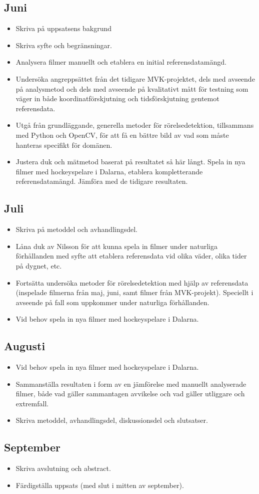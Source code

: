 \documentclass[a4paper,12pt]{article}
\begin{document}
\subsection*{Juni}
\begin{itemize}
  \item Skriva på uppsatsens bakgrund
  \item Skriva syfte och begränsningar.
  \item Analysera filmer manuellt och etablera en initial referensdatamängd.
  \item Undersöka angreppsättet från det tidigare MVK-projektet, dels med
    avseende på analysmetod och dels med avseende på kvalitativt mått för
    testning som väger in både koordinatförskjutning och tidsförskjutning
    gentemot referensdata.
  \item Utgå från grundläggande, generella metoder för rörelsedetektion,
    tillsammans med Python och OpenCV, för att få en bättre bild av vad som
    måste hanteras specifikt för domänen.
  \item Justera duk och mätmetod baserat på resultatet så här långt. Spela
    in nya filmer med hockeyspelare i Dalarna, etablera kompletterande
    referensdatamängd. Jämföra med de tidigare resultaten.
\end{itemize}

\subsection*{Juli}
\begin{itemize}
  \item Skriva på metoddel och avhandlingsdel.
  \item Låna duk av Nilsson för att kunna spela in filmer under naturliga
    förhållanden med syfte att etablera referensdata vid olika väder, olika
    tider på dygnet, etc.
  \item Fortsätta undersöka metoder för rörelsedetektion med hjälp av
    referensdata (inspelade filmerna från maj, juni, samt filmer från
    MVK-projekt). Speciellt i avseende på fall som uppkommer under
    naturliga förhållanden.
  \item Vid behov spela in nya filmer med hockeyspelare i Dalarna.
\end{itemize}

\subsection*{Augusti}
\begin{itemize}
  \item Vid behov spela in nya filmer med hockeyspelare i Dalarna.
  \item Sammanställa resultaten i form av en jämförelse med manuellt
    analyserade filmer, både vad gäller sammantagen avvikelse och vad
    gäller utliggare och extremfall.
  \item Skriva metoddel, avhandlingsdel, diskussionsdel och slutsatser.
\end{itemize}

\subsection*{September}
\begin{itemize}
  \item Skriva avslutning och abstract.
  \item Färdigställa uppsats (med slut i mitten av september).
\end{itemize}

\printbibliography{}
\end{document}
